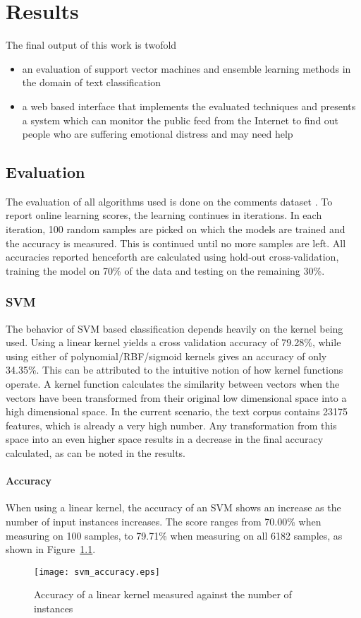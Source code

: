 \chapter{Results}
\label{chapter:Results}

The final output of this work is twofold
\begin{itemize}
    \item{an evaluation of support vector machines and ensemble learning methods in the domain of text classification}
    \item{a web based interface that implements the evaluated techniques and presents a system which can monitor the public feed from the Internet to find out people who are suffering emotional distress and may need help}
\end{itemize}

\section{Evaluation}
The evaluation of all algorithms used is done on the comments dataset \cite{kaggle}. To report online learning scores, the learning continues in iterations. In each iteration, 100 random samples are picked on which the models are trained and the accuracy is measured. This is continued until no more samples are left. All accuracies reported henceforth are calculated using hold-out cross-validation, training the model on 70\% of the data and testing on the remaining 30\%.

\subsection{SVM}
The behavior of SVM based classification depends heavily on the kernel being used. Using a linear kernel yields a cross validation accuracy of 79.28\%, while using either of polynomial/RBF/sigmoid kernels gives an accuracy of only 34.35\%. This can be attributed to the intuitive notion of how kernel functions operate. A kernel function calculates the similarity between vectors when the vectors have been transformed from their original low dimensional space into a high dimensional space. In the current scenario, the text corpus contains 23175 features, which is already a very high number. Any transformation from this space into an even higher space results in a decrease in the final accuracy calculated, as can be noted in the results.

\subsubsection{Accuracy}
When using a linear kernel, the accuracy of an SVM shows an increase as the number of input instances increases. The score ranges from 70.00\% when measuring on 100 samples, to 79.71\% when measuring on all 6182 samples, as shown in Figure~\ref{svm_accuracy}.
\begin{figure}
    \centering
    \texttt{[image: svm\_accuracy.eps]}
    \caption{Accuracy of a linear kernel measured against the number of instances}
    \label{svm_accuracy}
\end{figure}

